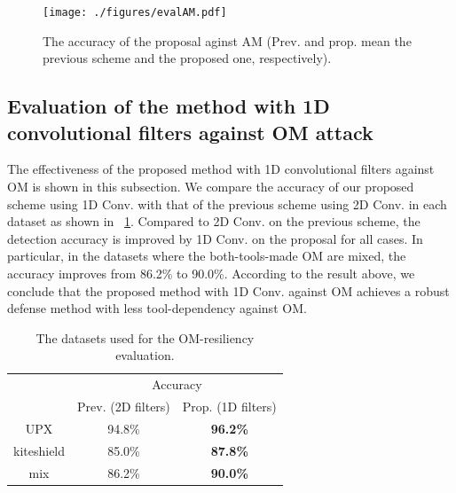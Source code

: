 \documentclass{ieeeaccess}
\begin{document}
\begin{figure}[t]
 \centering
 \texttt{[image: ./figures/evalAM.pdf]}
 \caption{The accuracy of the proposal aginst AM (Prev. and prop. mean the previous scheme and the proposed one, respectively).} 
 \label{fig:evalAM}
\end{figure}

\subsection{Evaluation of the method with 1D convolutional filters against OM attack}
The effectiveness of the proposed method with 1D convolutional filters against OM is shown in this subsection.
We compare the accuracy of our proposed scheme using 1D Conv. with that of the previous scheme using 2D Conv. in each dataset as shown in \tablename~\ref{tab:evalOM}.
Compared to 2D Conv. on the previous scheme, the detection accuracy is improved by 1D Conv. on the proposal for all cases.
In particular, in the datasets where the both-tools-made OM are mixed, the accuracy improves from 86.2\% to 90.0\%.
According to the result above, we conclude that the proposed method with 1D Conv. against OM achieves a robust defense method with less tool-dependency against OM.
\begin{table}[h]
  \begin{center}
    \caption{The datasets used for the OM-resiliency evaluation.}
    \label{tab:evalOM} 
    \begin{tabular}{|c|c|c|} \hline
      \multirow{2}{*}{\hfill  \hfill} & \multicolumn{2}{c|}{Accuracy}  \\ \cline{2-3} 
					     & Prev. (2D filters) & Prop. (1D filters) \\ \hline \hline
        UPX & 94.8\% & \textbf{96.2\%} \\ \cline{1-3} 
        kiteshield & 85.0\% & \textbf{87.8\%} \\ \cline{1-3} 
        mix & 86.2\% & \textbf{90.0\%} \\ \cline{1-3} 
  \end{tabular}
  \end{center}
\end{table}
\end{document}
